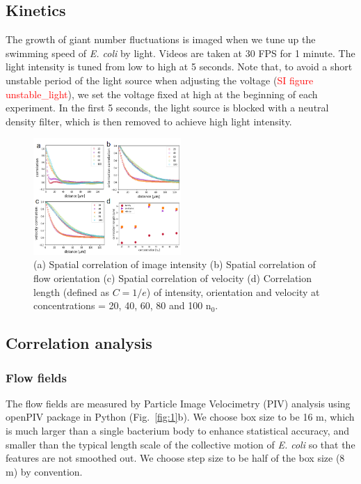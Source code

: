 \documentclass[twocolumn,aps,pre,amsmath,amssymb,floatfix,longbibliography]{revtex4-1}
\begin{document}
\subsection{Kinetics}
The growth of giant number fluctuations is imaged when we tune up the swimming speed of \textit{E. coli} by light. Videos are taken at 30 FPS for 1 minute. The light intensity is tuned from low to high at 5 seconds. Note that, to avoid a short unstable period of the light source when adjusting the voltage (\textcolor{red}{SI figure unstable\_light}), we set the voltage fixed at high at the beginning of each experiment. In the first 5 seconds, the light source is blocked with a neutral density filter, which is then removed to achieve high light intensity.

\begin{figure}[!]
\begin{center}
\includegraphics[width=0.5\textwidth]{GNF-figures-2.png}
\caption[]{(a) Spatial correlation of image intensity (b) Spatial correlation of flow orientation (c) Spatial correlation of velocity (d) Correlation length (defined as $C=1/e$) of intensity, orientation and velocity at concentrations = 20, 40, 60, 80 and 100 n$_0$.}
\label{fig:2}
\end{center}
\end{figure}

\subsection{Correlation analysis}

\subsubsection{Flow fields}
The flow fields are measured by Particle Image Velocimetry (PIV) analysis using openPIV package in Python \cite{openpiv} (Fig.~\ref{fig:1}b). We choose box size to be 16 \textmu m, which is much larger than a single bacterium body to enhance statistical accuracy, and smaller than the typical length scale of the collective motion of \textit{E. coli} so that the features are not smoothed out. We choose step size to be half of the box size (8 \textmu m) by convention.
\end{document}
